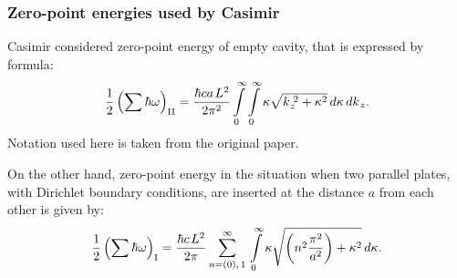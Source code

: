 \documentclass[10pt,t]{beamer}
\begin{document}
\begin{frame}
  \frametitle{Zero-point energies used by Casimir}


  Casimir considered zero-point energy of empty cavity, that is expressed
  by formula:
  \begin{equation}
    \label{eq:Short-history-ETC-01}
    \frac{ 1 }{ 2 } \left( \sum \hbar \omega \right)_{ \text{II} } =
    \frac{ \hbar c a \hspace{0.11em} L^{ 2 } }{ 2 \pi^{ 2 } }
    \int\limits_{ 0 }^{ \infty } \int\limits_{ 0 }^{ \infty } \kappa
    \sqrt{ k_{ \hspace{0.05em} z }^{ \,\, 2 } + \kappa^{ 2 } } \, d\kappa \,
    dk_{ \hspace{0.07em} z }.
  \end{equation}
  Notation used here is taken from the original paper.

  On the other hand, zero-point energy in the situation when
  two parallel plates, with Dirichlet boundary conditions, are
  inserted at the distance $a$ from each other is given by:
  \begin{equation}
    \label{eq:Short-history-ETC-02}
    \frac{ 1 }{ 2 } \left( \sum \hbar \omega \right)_{ \text{I} } =
    \frac{ \hbar c \hspace{0.11em} L^{ 2 } }{ 2 \pi }
    \sum_{ n = ( 0 ), \, 1 }^{ \infty } \, \int\limits_{ 0 }^{ \infty } \kappa
    \sqrt{ \left( n^{ 2 } \frac{ \pi^{ 2 } }{ a^{ 2 } } \right)
      + \kappa^{ 2 } } \, d\kappa.
  \end{equation}

\end{frame}
\end{document}
